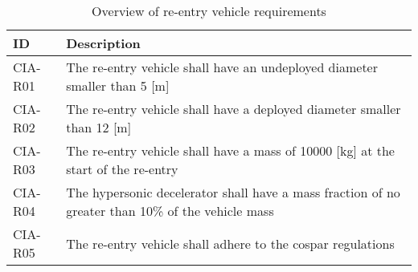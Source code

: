 \begin{table}[H]
	\caption{Overview of re-entry vehicle requirements} 
	\begin{tabular}{|p{}|p{}|}
	    \hline
	    ID          & Description                                                                                                      \\ \hline \hline
	CIA-R01 & The re-entry vehicle shall have an undeployed diameter smaller than 5 [m]                         				            \\ \hline
	CIA-R02 & The re-entry vehicle shall have a deployed diameter smaller than 12 [m]                         				            \\ \hline	
	CIA-R03 & The re-entry vehicle shall have a mass of 10000 [kg] at the start of the re-entry                       				            \\ \hline
	CIA-R04 & The hypersonic decelerator shall have a mass fraction of no greater than 10\% of the vehicle mass  \\ \hline
	CIA-R05 &  The re-entry vehicle shall adhere to the \gls{cospar} regulations \\ \hline
	

    \end{tabular}
\end{table}






















